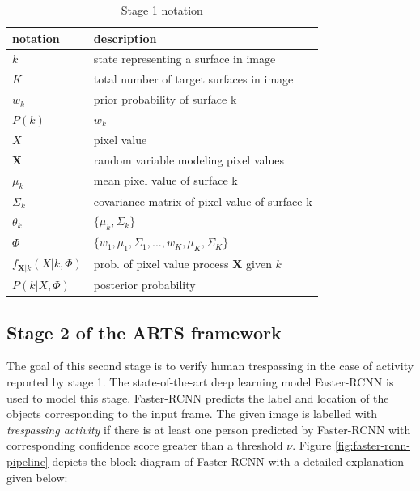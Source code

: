 \begin{table}
\caption{Stage 1 notation}
\label{table:stage1-notation}
\begin{tabular}{| l | l |} \hline

notation                 & description                                   \\ \hline \hline
$k$                      & state representing a surface in image         \\ \hline
$K$                      & total number of target surfaces in image      \\ \hline
$w_k$                    & prior probability of surface k                \\ \hline
$P(k)$                   & $w_k$                                         \\ \hline
$X$                      & pixel value                                   \\ \hline
$\mathbf{X}$             & random variable modeling pixel values         \\ \hline        
$\mu_k$                  & mean pixel value of surface k                 \\ \hline
$\Sigma_k$               & \small covariance matrix of pixel value of surface k \\ \hline
$\theta_k$               & $\{ \mu_k, \Sigma_k \}$                       \\ \hline
$\Phi $                  & $ \{w_1, \mu_1, \Sigma_1,..., w_K, \mu_K, \Sigma_K \}$     \\ \hline
$f_{\mathbf{X}|k}(X|k,\Phi)$    & prob. of pixel value process $\mathbf{X}$ given $k$     \\ \hline
$P(k|X,\Phi)$            & posterior probability                          \\ \hline
\end{tabular}
\end{table}


\subsection{Stage 2 of the ARTS framework}
\label{sec:stage2}
The goal of this second stage is to verify human trespassing in the case of activity reported by stage 1. The state-of-the-art deep learning model Faster-RCNN\cite{ref_fasterrcnn} is used to model this stage. Faster-RCNN predicts the label and location of the objects corresponding to the input frame. The given image is labelled with \textit{trespassing activity} if there is at least one person predicted by Faster-RCNN with corresponding confidence score greater than a threshold $\nu$. Figure \ref{fig:faster-rcnn-pipeline} depicts the block diagram of Faster-RCNN with a detailed explanation given below: 


